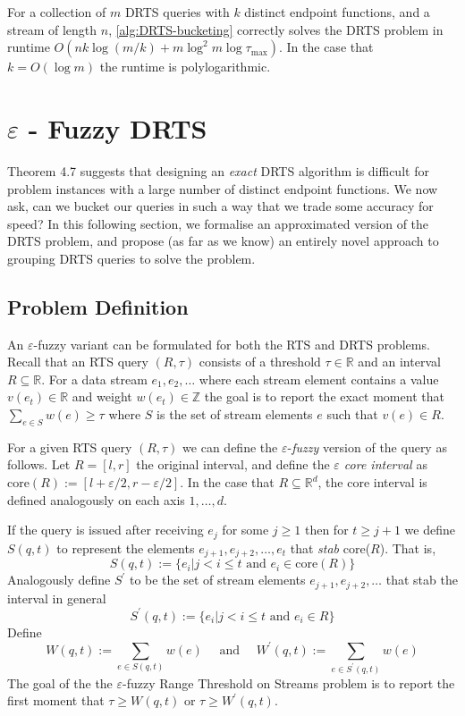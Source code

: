 \begin{theorem}
    For a collection of $m$ DRTS queries with $k$ distinct endpoint functions, and a stream of length $n$, \cref{alg:DRTS-bucketing} correctly solves the DRTS problem in runtime $O(nk\log(m/k) + m\log^2 m\log\tau_{\max})$. In the case that $k = O(\log m)$ the runtime is polylogarithmic.
\end{theorem}



\newpage
\section{$\varepsilon$ - Fuzzy DRTS}

Theorem 4.7 suggests that designing an \textit{exact} DRTS algorithm is difficult for problem instances with a large number of distinct endpoint functions. We now ask, can we bucket our queries in such a way that we trade some accuracy for speed? In this following section, we formalise an approximated version of the DRTS problem, and propose (as far as we know) an entirely novel approach to grouping DRTS queries to solve the problem.

\subsection{Problem Definition}

An $\varepsilon$-fuzzy variant can be formulated for both the RTS and DRTS problems.  Recall that an RTS query $(R, \tau)$ consists of a threshold $\tau \in\mathbb{R}$ and an interval $R \subseteq\mathbb{R}$. For a data stream $e_1,e_2,\dots$ where each stream element contains a value $v(e_t)\in\mathbb{R}$ and weight $w(e_t)\in\mathbb{Z}$ the goal is to report the exact moment that $\sum_{e\in S} w(e) \geq \tau$ where $S$ is the set of stream elements $e$ such that $v(e)\in R$. 

For a given RTS query $(R, \tau)$ we can define the $\varepsilon$-\textit{fuzzy} version of the query as follows. Let $R = [l, r]$ the original interval, and define the \textit{$\varepsilon$ core interval} as $\text{core}(R) := [l+\varepsilon/2, r-\varepsilon/2]$. In the case that $R\subseteq\mathbb{R}^d$, the core interval is defined analogously on each axis $1,\dots,d$.  

If the query is issued after receiving $e_j$ for some $j\geq 1$ then for $t\geq j+1$ we define $S(q,t)$ to represent the elements $e_{j+1},e_{j+2},\dots,e_t$ that \textit{stab} core($R$). That is, 
$$S(q, t) := \{e_i | j < i \leq t \text{ and } e_i \in \text{core}(R)\}$$
Analogously define $S^\prime$ to be the set of stream elements $e_{j+1},e_{j+2},\dots$ that stab the interval in general
$$S^\prime(q, t) := \{e_i | j < i \leq t \text{ and } e_i \in R\}$$
Define
$$W(q, t) := \sum_{e\in S(q,t)}w(e) \quad \text{ and } \quad W^\prime(q, t) := \sum_{e\in S^\prime(q,t)}w(e)$$
The goal of the the $\varepsilon$-fuzzy Range Threshold on Streams problem is to report the first moment that $\tau\geq W(q,t)$ or $\tau \geq W^\prime(q,t)$.

